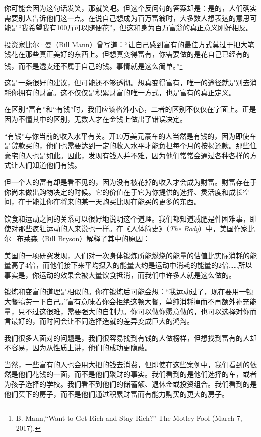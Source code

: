 你可能会因为这句话发笑，那就笑吧。但这个反问句的答案却是：是的，人们确实需要别人告诉他们这一点。在说自己想成为百万富翁时，大多数人想表达的意思可能是“我希望我有100万可以随便花”，但这和身为百万富翁的真正意义刚好相反。

投资家比尔·曼（Bill Mann）曾写道：“让自己感到富有的最佳方式莫过于把大笔钱花在那些真正美好的东西上。但想真变得富有，你需要做的是花自己已经有的钱，而不是透支还不属于自己的钱。事情就是这么简单。”\footnote{B. Mann,“Want to Get Rich and Stay Rich?” The Motley Fool (March 7, 2017).}

这是一条很好的建议，但可能还不够透彻。想真变得富有，唯一的途径就是别去消耗你拥有的财富。这不仅仅是积累财富的唯一方式，也是富有的真正定义。

在区别“富有”和“有钱”时，我们应该格外小心，二者的区别不仅仅在字面上。正是因为不懂其中的区别，无数人才在金钱上做出了错误决定。

“有钱”与你当前的收入水平有关。开10万美元豪车的人当然是有钱的，因为即使车是贷款买的，他们也需要达到一定的收入水平才能负担每个月的按揭还款。那些住豪宅的人也是如此。因此，发现有钱人并不难，因为他们常常会通过各种各样的方式让人们知道他们有钱。

但一个人的富有却是看不见的，因为没有被花掉的收入才会成为财富。财富存在于你尚未做出购物决定的时候。它的价值在于它为你提供的选择、灵活度和成长空间，在于能让你在将来的某一天购买比现在能买的更多的东西。

饮食和运动之间的关系可以很好地说明这个道理。我们都知道减肥是件困难事，即使对那些疯狂运动的人来说也一样。在《人体简史》（\textit{The Body}）中，美国作家比尔·布莱森（Bill Bryson）解释了其中的原因：

{\kaishu

美国的一项研究发现，人们对一次身体锻炼所能燃烧的能量的估值比实际消耗的能量高了4倍，而他们接下来平均摄入的能量大约是运动中消耗的能量的2倍……所以事实是，你运动的效果会被大量饮食抵消，而我们中许多人就是这么做的。

}

锻炼和变富的道理是相似的。你在锻炼后可能会想：“我运动过了，现在要用一顿大餐犒劳一下自己。”富有意味着你会拒绝这顿大餐，单纯消耗掉而不再额外补充能量，只不过这很难，需要强大的自制力。你可以做你愿意做的，也可以选择对你而言最好的，而时间会让不同选择造就的差异变成巨大的鸿沟。

我们很多人面对的问题是，我们很容易找到有钱的人做榜样，但想找到富有的人却不容易，因为从性质上讲，他们的成功更隐蔽。

当然，一些富有的人也会用大把的钱去消费，但即使在这些案例中，我们看到的依然是他们花钱的一面，而不是他们聚财的事实。我们看到的是他们选择的车，或者为孩子选择的学校。我们看不到他们的储蓄额、退休金或投资组合。我们看到的是他们买下的房子，而不是他们通过积累财富而有能力购买的更大的房子。

